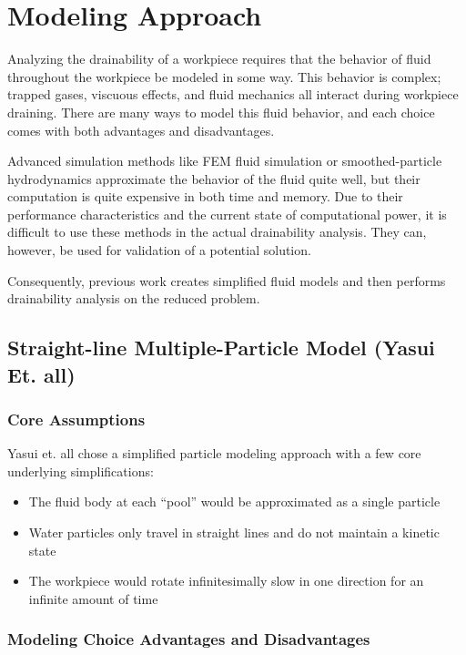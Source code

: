 						\chapter{Modeling Approach}

Analyzing the drainability of a workpiece requires that the behavior of fluid throughout the workpiece be modeled in some way. This behavior is complex; trapped gases, viscuous effects, and fluid mechanics all interact during workpiece draining. There are many ways to model this fluid behavior, and each choice comes with both advantages and disadvantages.

Advanced simulation methods like FEM fluid simulation or smoothed-particle hydrodynamics approximate the behavior of the fluid quite well, but their computation is quite expensive in both time and memory. Due to their performance characteristics and the current state of computational power, it is difficult to use these methods in the actual drainability analysis. They can, however, be used for validation of a potential solution.

Consequently, previous work creates simplified fluid models and then performs drainability analysis on the reduced problem.

\section{Straight-line Multiple-Particle Model (Yasui Et. all)}

	\subsection{Core Assumptions}

Yasui et. all chose a simplified particle modeling approach with a few core underlying simplifications:

\begin{itemize}
	\item The fluid body at each ``pool'' would be approximated as a single particle
	\item Water particles only travel in straight lines and do not maintain a kinetic state
	\item The workpiece would rotate infinitesimally slow in one direction for an infinite amount of time
\end{itemize}

	\subsection{Modeling Choice Advantages and Disadvantages}

